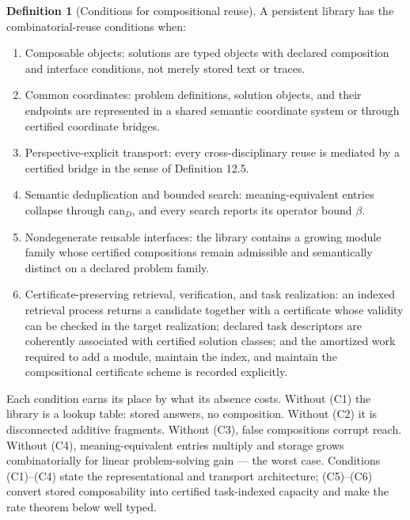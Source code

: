 \documentclass[11pt]{article}
\theoremstyle{definition}
\newtheorem{definition}{Definition}
\begin{document}
\begin{definition}[Conditions for compositional reuse]
A persistent library has the combinatorial-reuse conditions when:
\begin{enumerate}[label=(C\arabic*)]
\item[(C1)] Composable objects: solutions are typed objects with declared composition and interface conditions, not merely stored text or traces.
\item[(C2)] Common coordinates: problem definitions, solution objects, and their endpoints are represented in a shared semantic coordinate system or through certified coordinate bridges.
\item[(C3)] Perspective-explicit transport: every cross-disciplinary reuse is mediated by a certified bridge in the sense of Definition 12.5.
\item[(C4)] Semantic deduplication and bounded search: meaning-equivalent entries collapse through $\mathrm{can}_D$, and every search reports its operator bound $\beta$.
\item[(C5)] Nondegenerate reusable interfaces: the library contains a growing module family whose certified compositions remain admissible and semantically distinct on a declared problem family.
\item[(C6)] Certificate-preserving retrieval, verification, and task realization: an indexed retrieval process returns a candidate together with a certificate whose validity can be checked in the target realization; declared task descriptors are coherently associated with certified solution classes; and the amortized work required to add a module, maintain the index, and maintain the compositional certificate scheme is recorded explicitly.
\end{enumerate}
Each condition earns its place by what its absence costs. Without (C1) the library is a lookup table: stored answers, no composition. Without (C2) it is disconnected additive fragments. Without (C3), false compositions corrupt reach. Without (C4), meaning-equivalent entries multiply and storage grows combinatorially for linear problem-solving gain --- the worst case. Conditions (C1)--(C4) state the representational and transport architecture; (C5)--(C6) convert stored composability into certified task-indexed capacity and make the rate theorem below well typed.
\end{definition}
\end{document}
